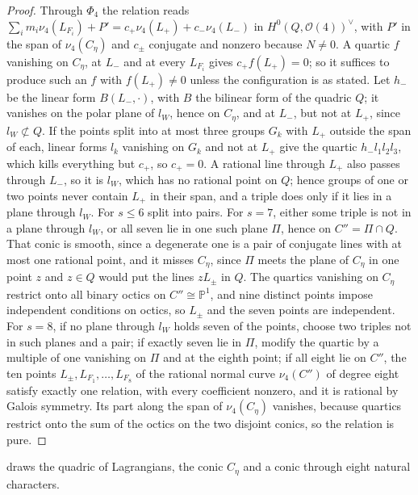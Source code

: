 \documentclass[11pt,reqno]{amsart}
\theoremstyle{plain}
\theoremstyle{definition}
\theoremstyle{remark}
\newcommand{\PP}{\mathbb{P}}
\newcommand{\cO}{\mathcal{O}}
\begin{document}
\begin{proof}
Through $\Phi_{4}$ the relation reads
$\sum_{i}m_{i}\nu_{4}(L_{F_{i}})+P'=c_{+}\nu_{4}(L_{+})+c_{-}\nu_{4}(L_{-})$ in
$H^{0}(Q,\cO(4))^{\vee}$, with $P'$ in the span of $\nu_{4}(C_{\eta})$ and
$c_{\pm}$ conjugate and nonzero because $N\ne0$. A quartic $f$ vanishing on
$C_{\eta}$, at $L_{-}$ and at every $L_{F_{i}}$ gives $c_{+}f(L_{+})=0$; so it
suffices to produce such an $f$ with $f(L_{+})\ne0$ unless the configuration
is as stated. Let $h_{-}$ be the linear form $B(L_{-},\cdot)$, with $B$ the
bilinear form of the quadric $Q$; it vanishes on the polar plane of $l_{W}$,
hence on $C_{\eta}$, and at $L_{-}$, but not at $L_{+}$, since
$l_{W}\not\subset Q$. If the points split into at most three groups
$G_{k}$ with $L_{+}$ outside the span of each, linear forms $l_{k}$ vanishing
on $G_{k}$ and not at $L_{+}$ give the quartic $h_{-}l_{1}l_{2}l_{3}$, which
kills everything but $c_{+}$, so $c_{+}=0$. A rational line through $L_{+}$
also passes through $L_{-}$, so it is $l_{W}$, which has no rational point on
$Q$; hence groups of one or two points
never contain $L_{+}$ in their span, and a triple does only if it lies in a
plane through $l_{W}$. For $s\le6$ split into pairs. For $s=7$, either some
triple is not in a plane through $l_{W}$, or all seven lie in one such plane
$\Pi$, hence on $C''=\Pi\cap Q$. That conic is smooth, since a degenerate one
is a pair of conjugate lines with at most one rational point, and it misses
$C_{\eta}$, since $\Pi$ meets the plane of $C_{\eta}$ in one point $z$ and
$z\in Q$ would put the lines $zL_{\pm}$ in $Q$. The quartics vanishing on
$C_{\eta}$ restrict onto all binary octics on $C''\cong\PP^{1}$, and nine
distinct points impose independent conditions on octics, so $L_{\pm}$ and the
seven points are independent. For $s=8$, if no plane through $l_{W}$ holds
seven of the points, choose two triples not in such planes and a pair; if
exactly seven lie in $\Pi$, modify the quartic by a multiple of one vanishing
on $\Pi$ and at the eighth point; if all eight lie on $C''$, the ten points
$L_{\pm},L_{F_{1}},\dots,L_{F_{8}}$ of the rational normal curve
$\nu_{4}(C'')$ of degree eight satisfy exactly one relation, with every
coefficient nonzero, and it is rational by Galois symmetry. Its part along the
span of $\nu_{4}(C_{\eta})$ vanishes, because quartics restrict onto the sum of
the octics on the two disjoint conics, so the relation is pure.
\end{proof}

 draws the quadric of Lagrangians, the conic
$C_{\eta}$ and a conic through eight natural characters.
\end{document}

